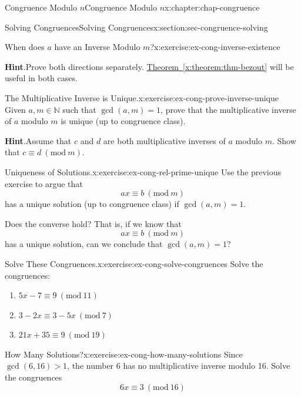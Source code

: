 \documentclass[oneside,10pt,]{book}
\newcommand{\blocktitlefont}{\relax}
\newcommand{\xreffont}{\relax}
\numberwithin{equation}{section}
\newcommand{\Mod}[1]{\ \left(\mathrm{mod}\ #1\right)}
\newcommand{\gt}{>}
\begin{document}
\begin{chapterptx}{Congruence Modulo \(n\)}{}{Congruence Modulo \(n\)}{}{}{x:chapter:chap-congruence}
\begin{sectionptx}{Solving Congruences}{}{Solving Congruences}{}{}{x:section:sec-congruence-solving}
\begin{inlineexercise}{When does \(a\) have an Inverse Modulo \(m\)?}{x:exercise:ex-cong-inverse-existence}
\par\smallskip%
\noindent\textbf{\blocktitlefont Hint}.\hypertarget{g:hint:id536226}{}\quad{}Prove both directions separately. \hyperref[x:theorem:thm-bezout]{Theorem~{\xreffont\ref{x:theorem:thm-bezout}}} will be useful in both cases.%
\end{inlineexercise}%
\begin{inlineexercise}{The Multiplicative Inverse is Unique.}{x:exercise:ex-cong-prove-inverse-unique}%
Given \(a, m \in \mathbb{N}\) such that \(\gcd(a,m) = 1\), prove that the multiplicative inverse of \(a\) modulo \(m\) is unique (up to congruence class).%
\par\smallskip%
\noindent\textbf{\blocktitlefont Hint}.\hypertarget{g:hint:id536268}{}\quad{}Assume that \(c\) and \(d\) are both multiplicative inverses of \(a\) modulo \(m\). Show that \(c \equiv d \Mod{m}\).%
\end{inlineexercise}%
\begin{inlineexercise}{Uniqueness of Solutions.}{x:exercise:ex-cong-rel-prime-unique}%
Use the previous exercise to argue that%
\begin{equation*}
ax \equiv b \Mod{m}
\end{equation*}
has a unique solution (up to congruence class) if \(\gcd(a,m) = 1\).%
\par
Does the converse hold? That is, if we know that%
\begin{equation*}
ax \equiv b \Mod{m}
\end{equation*}
has a unique solution, can we conclude that \(\gcd(a,m) = 1\)?%
\end{inlineexercise}%
\begin{inlineexercise}{Solve These Congruences.}{x:exercise:ex-cong-solve-congruences}%
Solve the congruences:%
\begin{enumerate}[label=(\alph*)]
\item{}\(\displaystyle 5x - 7 \equiv 9 \Mod{11}\)%
\item{}\(\displaystyle 3 - 2x \equiv 3 - 5x \Mod{7}\)%
\item{}\(\displaystyle 21x + 35 \equiv 9 \Mod{19}\)%
\end{enumerate}
%
\end{inlineexercise}%
\begin{inlineexercise}{How Many Solutions?}{x:exercise:ex-cong-how-many-solutions}%
Since \(\gcd(6,16) \gt 1\), the number 6 has no multiplicative inverse modulo 16. Solve the congruences%
\begin{equation*}
6x \equiv 3 \Mod{16}

\end{equation*}
\end{inlineexercise}
\end{sectionptx}
\end{chapterptx}
\end{document}
